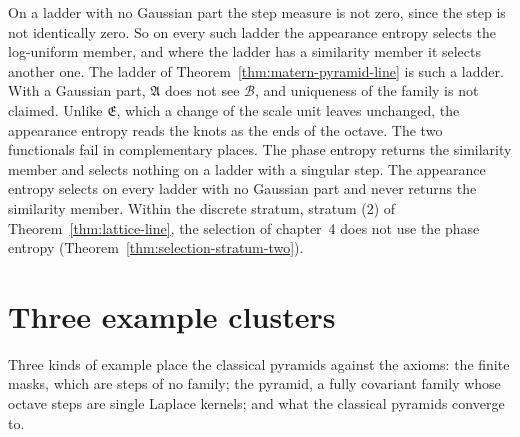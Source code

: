 On a ladder with no Gaussian part the step measure is not zero, since the step is not identically
zero. So on every such ladder the appearance entropy selects the log-uniform member, and where the
ladder has a similarity member it selects another one. The \Matern{} ladder of
Theorem~\ref{thm:matern-pyramid-line} is such a ladder. With a Gaussian part, $\mathfrak{A}$ does
not see $\mathcal{B}$, and uniqueness of the family is not claimed. Unlike $\mathfrak{E}$, which a
change of the scale unit leaves unchanged, the appearance entropy reads the knots as the ends of the
octave. The two functionals fail in complementary places. The phase entropy returns the similarity
member and selects nothing on a ladder with a singular step. The appearance entropy selects on every
ladder with no Gaussian part and never returns the similarity member. Within the discrete stratum, stratum (2) of
Theorem~\ref{thm:lattice-line}, the selection of chapter~4 does not use the phase entropy
(Theorem~\ref{thm:selection-stratum-two}).

\section{Three example clusters}
\label{sec:line-examples}

Three kinds of example place the classical pyramids against the axioms: the finite masks, which are
steps of no family; the \Matern{} pyramid, a fully covariant family whose octave steps are single
Laplace kernels; and what the classical pyramids converge to.

